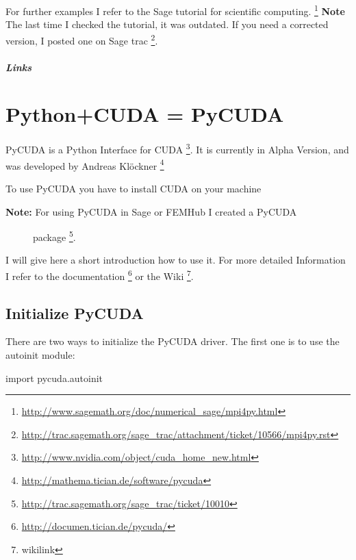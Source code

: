 \documentclass[letterpaper,10pt,english]{manual}
\begin{document}
For further examples I refer to the Sage tutorial for scientific
computing.  \footnote{
\href{http://www.sagemath.org/doc/numerical\_sage/mpi4py.html}{http://www.sagemath.org/doc/numerical\_sage/mpi4py.html}
}
\textbf{Note} The last time I checked the tutorial, it was outdated.
If you need a corrected version, I posted one on Sage trac \footnote{
\href{http://trac.sagemath.org/sage\_trac/attachment/ticket/10566/mpi4py.rst}{http://trac.sagemath.org/sage\_trac/attachment/ticket/10566/mpi4py.rst}
}.
\paragraph{Links}

\resetcurrentobjects
\hypertarget{--doc-PyCUDA}{}

\chapter{Python+CUDA = PyCUDA}

PyCUDA is a Python Interface for CUDA \footnote{
\href{http://www.nvidia.com/object/cuda\_home\_new.html}{http://www.nvidia.com/object/cuda\_home\_new.html}
}. It is currently in Alpha
Version, and was developed by Andreas Klöckner \footnote{
\href{http://mathema.tician.de/software/pycuda}{http://mathema.tician.de/software/pycuda}
}

To use PyCUDA you have to install CUDA on your machine
\begin{description}
\item[\textbf{Note:} For using PyCUDA in Sage or FEMHub I created a PyCUDA] \leavevmode
package \footnote{
\href{http://trac.sagemath.org/sage\_trac/ticket/10010}{http://trac.sagemath.org/sage\_trac/ticket/10010}
}.

\end{description}

I will give here a short introduction how to use it. For more detailed
Information I refer to the documentation \footnote{
\href{http://documen.tician.de/pycuda/}{http://documen.tician.de/pycuda/}
} or the Wiki \footnote{
wikilink
}.


\section{Initialize PyCUDA}

There are two ways to initialize the PyCUDA driver. The first one is
to use the autoinit module:

import pycuda.autoinit
\end{document}
